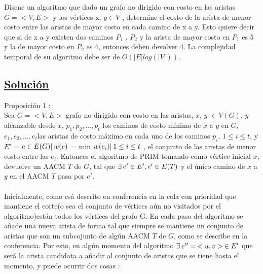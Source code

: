 \documentclass{article}
\begin{document}
    Disene un algoritmo que dado un grafo no dirigido con costo en las aristas $G = <V, E>$ y los v\'ertices x, $y \in  V$ ,
    determine el costo de la arista de menor costo entre las aristas de mayor costo en cada camino de x a y. Esto
    quiere decir que si de x a y existen dos caminos $P_1$ , $P_2$ y la arista de mayor costo en $P_1$ es 5 y la de mayor costo
    en $P_2$ es 4, entonces deben devolver 4. La complejidad temporal de su algoritmo debe ser de $O(|E|log(|V|))$.\\

    \subsection{\underline{Soluci\'on}}

    Proposici\'on 1 : \\
    
    Sea $G = <V,E>$ grafo no dirigido con costo en las aristas, $x$, $y$ $\in V(G)$, $y$ alcanzable desde $x$, \textbraceleft$p_1, p_2,..., p_t$\textbraceright 
    los caminos de costo m\'inimo de $x$ a $y$ en $G$, \textbraceleft$e_1, e_2,..., e_t$\textbraceright las aristas de costo m\'aximo en cada uno de los caminos $p_i$, $1 \leq i \leq t$, y
    $E'$ = \textbraceleft $e \in E(G) |\hspace{0.2em} w(e)$ = min \textbraceleft $w(e_i) |\hspace{0.2em} 1 \leq i \leq t$ \textbraceright \textbraceright, el conjunto
    de las aristas de menor costo entre las $e_i$. Entonces el algoritmo de PRIM tomando como v\'ertice inicial $x$, devuelve un AACM $T$ de $G$, tal que $\exists\hspace{0.2em}
    e' \in E', e' \in E(T)$ y el \'unico camino de $x$ a $y$ en el AACM $T$ pasa por $e'$.\\\\
    
    Inicialmente, como es\'a descrito en conferencia en la cola con prioridad que mantiene el corte(o sea el conjunto de v\'ertices a\'un no visitados por el algoritmo)est\'an todos los 
    v\'ertices del grafo G. En cada paso del algoritmo se a\~nade una nueva arista de forma tal que siempre se mantiene un conjunto de aristas que son un subcojunto de alg\'un AACM $T$ de $G$,
    como se describe en la conferencia. Por esto, en alg\'un momento del algoritmo $\exists\hspace{0.2em} e'' = \hspace{0.2em}<u,v>\hspace{0.2em} \in E'$ que ser\'a la arista candidata a 
    a\~nadir al conjunto de aristas que se tiene hasta el momento, y puede ocurrir dos cosas :\\\\
    
\end{document}
